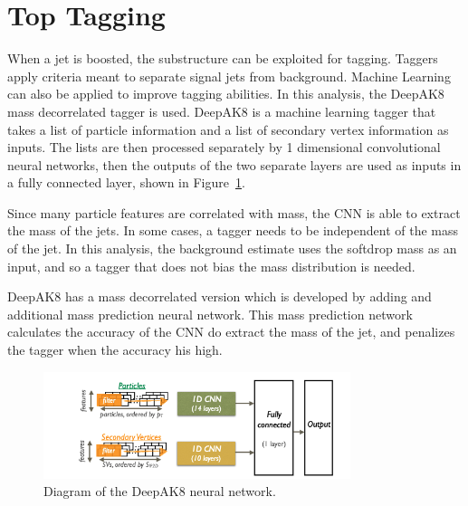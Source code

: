 \section{Top Tagging}
\label{sec:toptagging}

When a jet is boosted, the substructure can be exploited for tagging. Taggers apply criteria meant to separate signal jets from background. Machine Learning can also be applied to improve tagging abilities. In this analysis, the DeepAK8 mass decorrelated tagger is used. DeepAK8 is a machine learning tagger that takes a list of particle information and a list of secondary vertex information as inputs. The lists are then processed separately by 1 dimensional convolutional neural networks, then the outputs of the two separate layers are used as inputs in a fully connected layer, shown in Figure~\ref{fig:deepak8}.

Since many particle features are correlated with mass, the CNN is able to extract the mass of the jets. In some cases, a tagger needs to be independent of the mass of the jet. In this analysis, the background estimate uses the softdrop mass as an input, and so a tagger that does not bias the mass distribution is needed.

DeepAK8 has a mass decorrelated version which is developed by adding and additional mass prediction neural network. This mass prediction network calculates the accuracy of the CNN do extract the mass of the jet, and penalizes the tagger when the accuracy his high. 


\begin{figure}[h]
\centering
	\includegraphics[width=0.8\textwidth]{figures/deepak8.png}
	\caption{Diagram of the DeepAK8 neural network.}
	\label{fig:deepak8}
\end{figure}